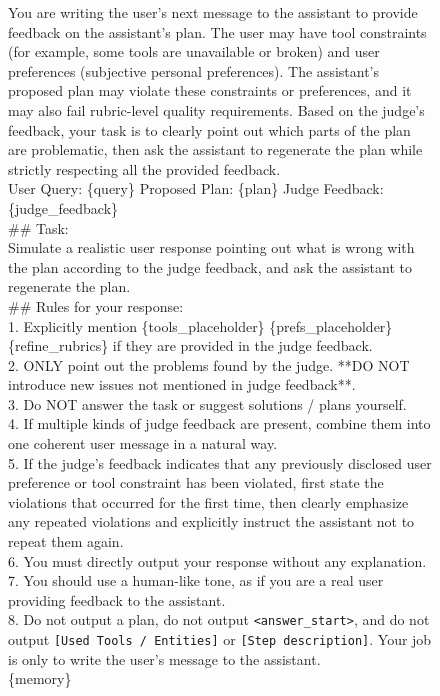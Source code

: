 \begin{figure}[htbp]
\begin{tcolorbox}[
    colback=black!5!white,
    colframe=black,
    title=User Simulator Prompt,
    fonttitle=\bfseries,
    colbacktitle=black!20!white,
    coltitle=black,
    boxrule=1.5pt,
    arc=5pt,
    boxsep=5pt,
    left=12pt,
    right=12pt,
    top=12pt,
    bottom=12pt
]

You are writing the user's next message to the assistant to provide feedback on the assistant's plan. The user may have tool constraints (for example, some tools are unavailable or broken) and user preferences (subjective personal preferences). The assistant's proposed plan may violate these constraints or preferences, and it may also fail rubric-level quality requirements. Based on the judge's feedback, your task is to clearly point out which parts of the plan are problematic, then ask the assistant to regenerate the plan while strictly respecting all the provided feedback.\\

User Query:
\{query\}
Proposed Plan:
\{plan\}
Judge Feedback:
\{judge\_feedback\}\\

\#\# Task:\\
Simulate a realistic user response pointing out what is wrong with the plan according to the judge feedback, and ask the assistant to regenerate the plan.\\

\#\# Rules for your response:\\
1. Explicitly mention \{tools\_placeholder\} \{prefs\_placeholder\} \{refine\_rubrics\} if they are provided in the judge feedback.\\
2. ONLY point out the problems found by the judge. **DO NOT introduce new issues not mentioned in judge feedback**.\\
3. Do NOT answer the task or suggest solutions / plans yourself.\\
4. If multiple kinds of judge feedback are present, combine them into one coherent user message in a natural way.\\
5. If the judge's feedback indicates that any previously disclosed user preference or tool constraint has been violated, first state the violations that occurred for the first time, then clearly emphasize any repeated violations and explicitly instruct the assistant not to repeat them again.\\
6. You must directly output your response without any explanation.\\
7. You should use a human-like tone, as if you are a real user providing feedback to the assistant.\\
8. Do not output a plan, do not output \texttt{<answer\_start>}, and do not output \texttt{[Used Tools / Entities]} or \texttt{[Step description]}. Your job is only to write the user's message to the assistant.\\
\{memory\}\\


\end{tcolorbox}
\end{figure}
